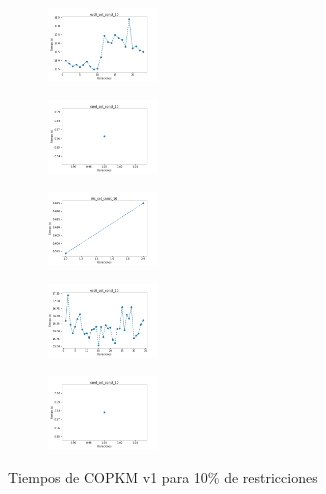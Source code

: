 \begin{figure}[H]
\begin{subfigure}
    \end{subfigure}
    \hfill
    \begin{subfigure}
        \centering
        \includegraphics[width=0.32\textwidth]{img/copkm/ecoli_set_const_10_49258669_time.png}
    \end{subfigure}
    \hfill
    \begin{subfigure}
        \centering
        \includegraphics[width=0.32\textwidth]{img/copkm/rand_set_const_10_49258669_time.png}
    \end{subfigure}
    \hfill
    \begin{subfigure}
        \centering
        \includegraphics[width=0.32\textwidth]{img/copkm/iris_set_const_10_3773969821_time.png}
    \end{subfigure}
    \hfill
    \begin{subfigure}
        \centering
        \includegraphics[width=0.32\textwidth]{img/copkm/ecoli_set_const_10_3773969821_time.png}
    \end{subfigure}
    \hfill
    \begin{subfigure}
        \centering
        \includegraphics[width=0.32\textwidth]{img/copkm/rand_set_const_10_3773969821_time.png}
    \end{subfigure}
    \caption{Tiempos de COPKM v1 para 10\% de restricciones}
\end{figure}

